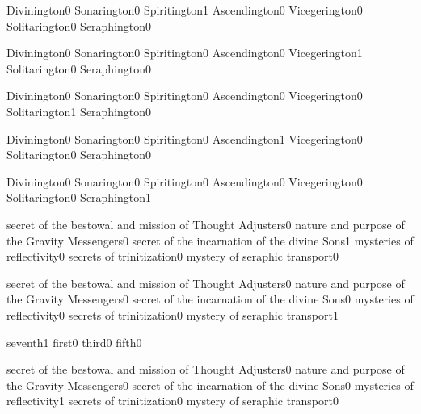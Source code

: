 {Divinington}{0}
{Sonarington}{0}
{Spiritington}{1}
{Ascendington}{0}
{Vicegerington}{0}
{Solitarington}{0}
{Seraphington}{0}
\qstop

{Divinington}{0}
{Sonarington}{0}
{Spiritington}{0}
{Ascendington}{0}
{Vicegerington}{1}
{Solitarington}{0}
{Seraphington}{0}
\qstop

{Divinington}{0}
{Sonarington}{0}
{Spiritington}{0}
{Ascendington}{0}
{Vicegerington}{0}
{Solitarington}{1}
{Seraphington}{0}
\qstop

{Divinington}{0}
{Sonarington}{0}
{Spiritington}{0}
{Ascendington}{1}
{Vicegerington}{0}
{Solitarington}{0}
{Seraphington}{0}
\qstop

{Divinington}{0}
{Sonarington}{0}
{Spiritington}{0}
{Ascendington}{0}
{Vicegerington}{0}
{Solitarington}{0}
{Seraphington}{1}
\qstop

{secret of the bestowal and mission of Thought Adjusters}{0}
{nature and purpose of the Gravity Messengers}{0}
{secret of the incarnation of the divine Sons}{1}
{mysteries of reflectivity}{0}
{secrets of trinitization}{0}
{mystery of seraphic transport}{0}
\qstop

{secret of the bestowal and mission of Thought Adjusters}{0}
{nature and purpose of the Gravity Messengers}{0}
{secret of the incarnation of the divine Sons}{0}
{mysteries of reflectivity}{0}
{secrets of trinitization}{0}
{mystery of seraphic transport}{1}
\qstop

{seventh}{1}
{first}{0}
{third}{0}
{fifth}{0}
\qstop

{secret of the bestowal and mission of Thought Adjusters}{0}
{nature and purpose of the Gravity Messengers}{0}
{secret of the incarnation of the divine Sons}{0}
{mysteries of reflectivity}{1}
{secrets of trinitization}{0}
{mystery of seraphic transport}{0}
\qstop

